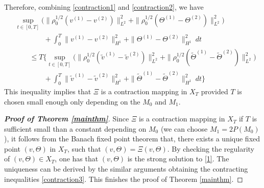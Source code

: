 \documentclass[12pt,a4paper]{amsart}
\numberwithin{equation}{section}
\theoremstyle{plain}
\theoremstyle{definition}
\begin{document}
Therefore, combining \eqref{contraction1} and \eqref{contraction2}, we have
\begin{equation}
\label{contraction3}
\begin{aligned}
&\sup\limits_{t\in[0,T]}\Big(\|\rho_{0}^{1/2}(v^{(1)}-v^{(2)})\|_{L^{2}}^2+\|\rho_{0}^{1/2}(\Theta^{(1)}-\Theta^{(2)})\|_{L^{2}}^2\Big)\\
&\qquad\qquad+\int_{0}^{T}\|v^{(1)}-v^{(2)}\|_{H^1}^2 +\|\Theta^{(1)}-\Theta^{(2)}\|_{H^1}^2\ dt\\
&\qquad \leq T \Big\{\sup\limits_{t\in[0,T]}\Big(\|\rho_{0}^{1/2}(\widetilde{v}^{(1)}-\widetilde{v}^{(2)})\|_{L^{2}}^2+\|\rho_{0}^{1/2}(\widetilde{\Theta}^{(1)}-\widetilde{\Theta}^{(2)})\|_{L^{2}}^2\Big)\\
&\qquad\qquad+\int_{0}^{T}\|\widetilde{v}^{(1)}-\widetilde{v}^{(2)}\|_{H^1}^2 +\|\widetilde{\Theta}^{(1)}-\widetilde{\Theta}^{(2)}\|_{H^1}^2\ dt \Big\}
\end{aligned}
\end{equation}
This inequality implies that $\Xi$ is a contraction mapping in $X_T$ provided $T$ is chosen small enough only depending on the $M_0$ and $M_1$.

\begin{proof}[\textbf{Proof of Theorem \ref{mainthm}}]
Since $\Xi$ is a contraction mapping in $X_T$ if $T$ is sufficient small than a constant depending on $M_0$ (we can choose $M_1=2P(M_0)$), it follows from the Banach fixed point theorem that, there exists a unique fixed point $(v,\Theta)$ in $X_T$, such that $(v,\Theta)=\Xi(v,\Theta)$. By checking the regularity of $(v,\Theta)\in X_T$, one has that $(v,\Theta)$ is the strong solution to \eqref{1}. The uniqueness can be derived by the similar arguments obtaining the contracting inequalities \eqref{contraction3}. This finishes the proof of Theorem \ref{mainthm}.
\end{proof}




\iffalse 
\end{document}
